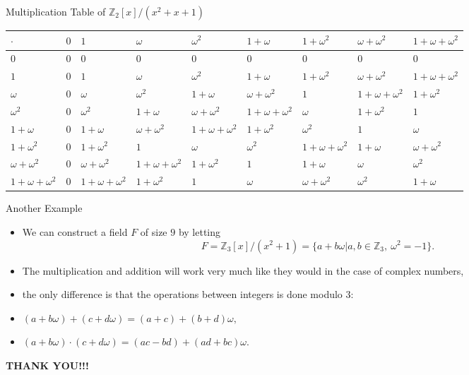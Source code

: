 \documentclass[ %
 10pt, xcolor={dvipsnames,svgnames,x11names,hyperref},
   hyperref={colorlinks=true,citecolor=green,linkcolor=DarkRed,urlcolor=ProcessBlue,anchorcolor=blue}
  ]{beamer}
\newenvironment{stepitemize}{\begin{itemize}[<+->]}{\end{itemize} }
\newcommand{\Z}{\mathbb{Z}}
\begin{document}
\begin{frame}{Multiplication Table of $\Z_2[x]/(x^2+x+1)$}
\begin{table}[H]
\tiny{
\begin{tabular}{ p{8mm}|p{8mm}|p{8mm} |p{8mm}|p{8mm}|p{8mm}|p{8mm}|p{8mm}|p{8mm}}
$\cdot$  & $0$ & $1$ & $\omega$ & $\omega^2$ & $1+\omega$ & $1+\omega^2$ & $\omega+\omega^2$ & $1+\omega+\omega^2$ \\
\hline
$0$ &$0$ & $0$ & $0$ & $0$ & $0$ & $0$ & $0$ & $0$   \\
\hline
$1$ & $0$ & $1$ & $\omega$ & $\omega^2$ & $1+\omega$ & $1+\omega^2$ & $\omega+\omega^2$ & $1+\omega+\omega^2$ \\
\hline
$\omega$ & $0$ & $\omega$ & $\omega^2$ & $1+\omega$  & $\omega+\omega^2$ & $1$ & $1+\omega+\omega^2$ & $1+\omega^2$\\ \hline
$\omega^2$ & $0$ & $\omega^2$ & $1+\omega$&$\omega+\omega^2$ & $1+\omega+\omega^2$ &$\omega$& $1+\omega^2$ & $1$\\
\hline
$1+\omega$ & $0$& $1+\omega$ & $\omega+\omega^2$&$1+\omega+\omega^2$ & $1+\omega^2$ &$\omega^2$& $1$ & $\omega$\\
\hline
$1+\omega^2$ & $0$& $1+\omega^2$&$1$ & $\omega$&$\omega^2$ &$1+\omega+\omega^2$& $1+\omega$ & $\omega+\omega^2$\\
\hline
$\omega+\omega^2$ & $0$&$\omega+\omega^2$& $1+\omega+\omega^2$&$1+\omega^2$ & $1$&$1+\omega$ &$\omega$& $\omega^2$\\
\hline
$1+\omega+\omega^2$ & $0$&$1+\omega+\omega^2$& $1+\omega^2$&$1$ & $\omega$&$\omega+\omega^2$ &$\omega^2$& $1+\omega$\\
\end{tabular}
}
\end{table}

\end{frame}

\begin{frame}{Another Example}
    \begin{stepitemize}
    \item We can construct a field $F$ of size $9$ by letting
$$F = \Z_3[x]/(x^2+1) = \{a+b\omega|a, b\in \Z_3, \:\omega^2=-1\}.$$

\item The multiplication and addition will work very much like they would in the case of complex numbers,
\item the only difference is that the operations between integers is done modulo $3$:
\item
$(a+b\omega)+(c+d\omega) = (a+c)+(b+d)\omega,$
\item $(a+b\omega)\cdot(c+d\omega)=(ac-bd)+(ad+bc)\omega.$

    \end{stepitemize}
\end{frame}
\begin{frame}
\centerline{ \color{blue} \bf{\large THANK YOU!!!}}

\end{frame}
\end{document}
